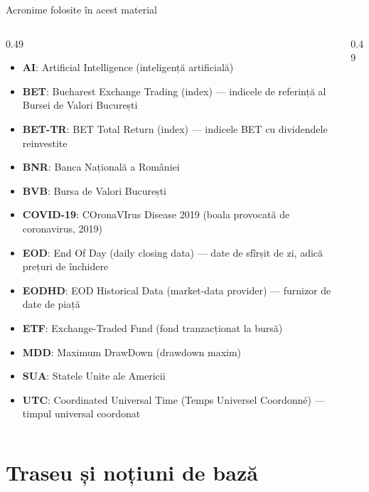 {
\begin{frame}[noframenumbering]
    \titlepage
\end{frame}
}
\begin{frame}{Acronime folosite în acest material}
\begin{columns}[T]
\begin{column}{0.49\textwidth}
\begin{itemize}\setlength{\itemsep}{0pt}
    \item \textbf{AI}: Artificial Intelligence (inteligență artificială)
    \item \textbf{BET}: Bucharest Exchange Trading (index) — indicele de referință al Bursei de Valori București
    \item \textbf{BET-TR}: BET Total Return (index) — indicele BET cu dividendele reinvestite
    \item \textbf{BNR}: Banca Națională a României
    \item \textbf{BVB}: Bursa de Valori București
    \item \textbf{COVID-19}: COronaVIrus Disease 2019 (boala provocată de coronavirus, 2019)
    \item \textbf{EOD}: End Of Day (daily closing data) — date de sfîrșit de zi, adică prețuri de închidere
    \item \textbf{EODHD}: EOD Historical Data (market-data provider) — furnizor de date de piață
    \item \textbf{ETF}: Exchange-Traded Fund (fond tranzacționat la bursă)
    \item \textbf{MDD}: Maximum DrawDown (drawdown maxim)
    \item \textbf{SUA}: Statele Unite ale Americii
    \item \textbf{UTC}: Coordinated Universal Time (Temps Universel Coordonné) — timpul universal coordonat
\end{itemize}
\end{column}
\begin{column}{0.49\textwidth}
\end{column}
\end{columns}
\end{frame}

\section{Traseu și noțiuni de bază}

